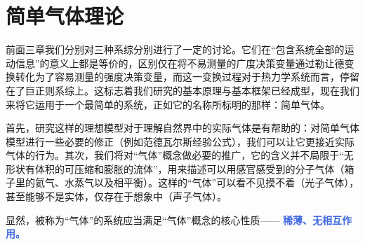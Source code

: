 \chapter{简单气体理论}

前面三章我们分别对三种系综分别进行了一定的讨论。它们在“包含系统全部的运动信息”的意义上都是等价的，区别仅在将不易测量的广度决策变量通过勒让德变换转化为了容易测量的强度决策变量，而这一变换过程对于热力学系统而言，停留在了巨正则系综上。这标志着我们研究的基本原理与基本框架已经成型，现在我们来将它运用于一个最简单的系统，正如它的名称所标明的那样：简单气体。

首先，研究这样的理想模型对于理解自然界中的实际气体是有帮助的：对简单气体模型进行一些必要的修正（例如范德瓦尔斯经验公式），我们可以让它更接近实际气体的行为。其次，我们将对“气体”概念做必要的推广，它的含义并不局限于“无形状有体积的可压缩和膨胀的流体”，用来描述可以用感官感受到的分子气体（箱子里的氦气、水蒸气以及相平衡）。这样的“气体”可以看不见摸不着（光子气体），甚至能够不是实体，仅存在于想象中（声子气体）。

显然，被称为“气体”的系统应当满足“气体”概念的核心性质—— \textcolor{RoyalBlue}{\textbf{\kaishu 稀薄、无相互作用。}}